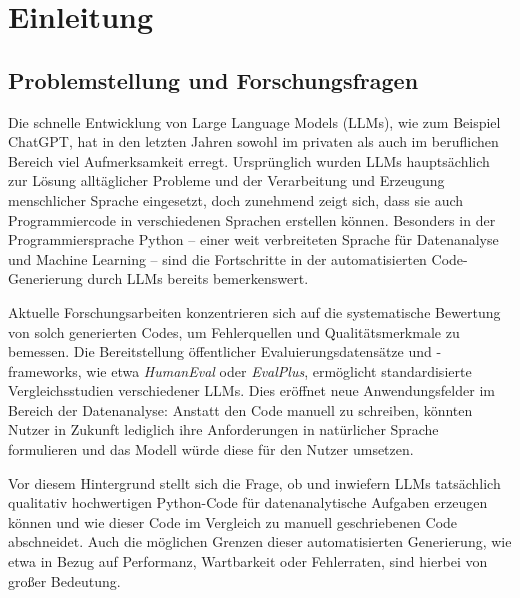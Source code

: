\documentclass[11pt,a4paper]{article}
\begin{document}

\tableofcontents
\newpage


\section{Einleitung}
\label{sec:einleitung}
\subsection{Problemstellung und Forschungsfragen}
\label{sec:forschungsfragen}
Die schnelle Entwicklung von Large Language Models (LLMs), wie zum Beispiel ChatGPT, hat in den letzten Jahren sowohl im privaten als auch im beruflichen Bereich viel Aufmerksamkeit erregt. Ursprünglich wurden LLMs hauptsächlich zur Lösung alltäglicher Probleme und der Verarbeitung und Erzeugung menschlicher Sprache eingesetzt, doch zunehmend zeigt sich, dass sie auch Programmiercode in verschiedenen Sprachen erstellen können. Besonders in der Programmiersprache Python – einer weit verbreiteten Sprache für Datenanalyse und Machine Learning – sind die Fortschritte in der automatisierten Code-Generierung durch LLMs bereits bemerkenswert\cite{NEURIPS2023_43e9d647,chen2021evaluatinglargelanguagemodels}.

Aktuelle Forschungsarbeiten konzentrieren sich auf die systematische Bewertung von solch generierten Codes, um Fehlerquellen und Qualitätsmerkmale zu bemessen. Die Bereitstellung öffentlicher Evaluierungsdatensätze und -frameworks, wie etwa \emph{HumanEval}\cite{chen2021evaluatinglargelanguagemodels} oder \emph{EvalPlus}\cite{evalplus}, ermöglicht standardisierte Vergleichsstudien verschiedener LLMs. Dies eröffnet neue Anwendungsfelder im Bereich der Datenanalyse: Anstatt den Code manuell zu schreiben, könnten Nutzer in Zukunft lediglich ihre Anforderungen in natürlicher Sprache formulieren und das Modell würde diese für den Nutzer umsetzen\cite{nijkamp2023codegenopenlargelanguage}.

Vor diesem Hintergrund stellt sich die Frage, ob und inwiefern LLMs tatsächlich qualitativ hochwertigen Python-Code für datenanalytische Aufgaben erzeugen können und wie dieser Code im Vergleich zu manuell geschriebenen Code abschneidet. Auch die möglichen Grenzen dieser automatisierten Generierung, wie etwa in Bezug auf Performanz, Wartbarkeit oder Fehlerraten, sind hierbei von großer Bedeutung\cite{wang2021codet5identifierawareunifiedpretrained}.
\end{document}
